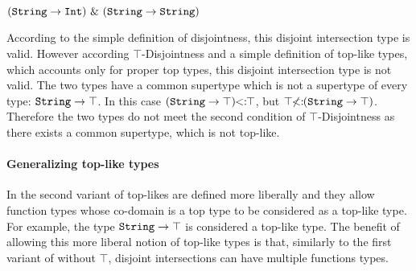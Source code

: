 $(\texttt{String} \to \texttt{Int})~\&~(\texttt{String} \to  \texttt{String})$
\vspace{5pt}

\noindent According to the simple definition of disjointness, this disjoint
intersection type is valid. However according $\top$-Disjointness and a simple definition
of top-like types, which accounts only for proper top types, this disjoint intersection type is not valid. 
The two types have a common supertype which is not a supertype of
every type: $\texttt{String} \to \top$. In this case $(\texttt{String} \to
\top)\!\!<:\!\!\top$, but $\top\!\!\not<:\!\!(\texttt{String} \to
\top)$. Therefore the two types do not meet the second condition of
$\top$-Disjointness as there exists a common supertype, which is not top-like.

\paragraph{Generalizing top-like types} In the second variant of \name 
top-likes are defined more liberally and they allow function types
whose co-domain is a top type to be considered as a top-like type.
For example, the type $\texttt{String}\to\top$ is considered a top-like
type. The benefit of allowing this more liberal notion of top-like
types is that, similarly to the first variant of \name without $\top$, 
disjoint intersections can have multiple functions types. 





 

